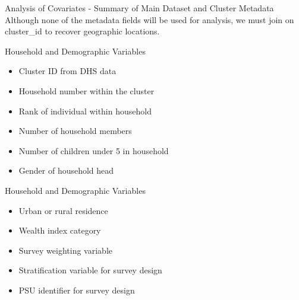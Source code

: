 \documentclass[
  ignorenonframetext,
]{beamer}
\providecommand{\tightlist}{%
  \setlength{\itemsep}{0pt}\setlength{\parskip}{0pt}}\usepackage{longtable,booktabs,array}
\begin{document}
\begin{frame}{Analysis of Covariates - Summary of Main Dataset and
Cluster Metadata}
\label{analysis-of-covariates---summary-of-main-dataset-and-cluster-metadata-1}
Although none of the metadata fields will be used for analysis, we must
join on cluster\_id to recover geographic locations.
\end{frame}

\begin{frame}{Household and Demographic Variables}
\label{household-and-demographic-variables}
\begin{itemize}
\tightlist
\item
  Cluster ID from DHS data\\
\item
  Household number within the cluster\\
\item
  Rank of individual within household\\
\item
  Number of household members\\
\item
  Number of children under 5 in household\\
\item
  Gender of household head
\end{itemize}
\end{frame}

\begin{frame}{Household and Demographic Variables}
\label{household-and-demographic-variables-1}
\begin{itemize}
\tightlist
\item
  Urban or rural residence\\
\item
  Wealth index category\\
\item
  Survey weighting variable\\
\item
  Stratification variable for survey design\\
\item
  PSU identifier for survey design
\end{itemize}
\end{frame}
\end{document}
